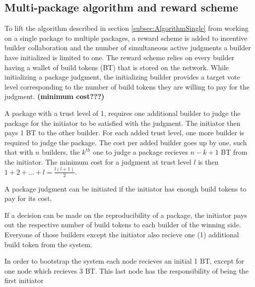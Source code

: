 \subsection{Multi-package algorithm and reward scheme}

To lift the algorithm described in section \ref{subsec:AlgorithmSingle} from working on a single package to multiple packages, a reward scheme is added to incentive builder collaboration and the number of simultaneous active judgments a builder have initialized is limited to one. The reward scheme relies on every builder having a wallet of build tokens (BT) that is stored on the network. While initializing a package judgment, the initializing builder provides a target vote level corresponding to the number of build tokens they are willing to pay for the judgment. \textbf{(minimum cost???)}

A package with a trust level of 1, requires one additional builder to judge the package for the initiator to be satisfied with the judgment. The initiator then pays 1 BT to the other builder. For each added trust level, one more builder is required to judge the package. The cost per added builder goes up by one, such that with $n$ builders, the $k^{th}$ one to judge a package recieves $n - k + 1$ BT from the initiator. The minimum cost for a judgment at trust level $l$ is then $1 + 2 + \dotsc + l = \frac{l(l+1)}{2}$.

A package judgment can be initiated if the initiator has enough build tokens to pay for its cost.

If a decision can be made on the reproducibility of a package, the initiator pays out the respective number of build tokens to each builder of the winning side. Everyone of those builders except the initiator also recieve one (1) additional build token from the system.

In order to bootstrap the system each node recieves an initial 1 BT, except for one node which recieves 3 BT. This last node has the responsibility of being the first initiator